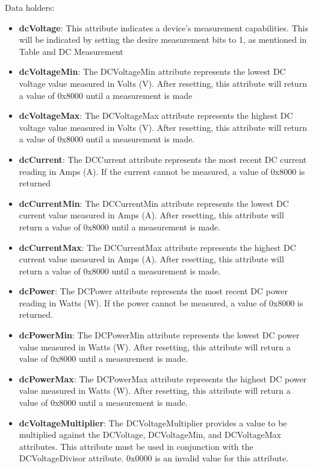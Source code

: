 \noindent
Data holders:

\begin{itemize}
\item \textbf{dcVoltage}: This attribute indicates a device’s measurement capabilities. This will be indicated by setting the desire measurement bits to 1, as mentioned in Table and DC Measurement
\item \textbf{dcVoltageMin}:     			The DCVoltageMin attribute represents the lowest DC voltage value measured in Volts (V). After resetting, this attribute will return a value of 0x8000 until a measurement is made					
\item \textbf{dcVoltageMax}: The DCVoltageMax attribute represents the highest DC voltage value measured in Volts (V). After resetting, this attribute will return a value of 0x8000 until a measurement is made.
\item \textbf{dcCurrent}: The DCCurrent attribute represents the most recent DC current reading in Amps (A). If the current cannot be measured, a value of 0x8000 is returned
\item \textbf{dcCurrentMin}: The DCCurrentMin attribute represents the lowest DC current value measured in Amps (A). After resetting, this attribute will return a value of 0x8000 until a measurement is made.
\item \textbf{dcCurrentMax}: The DCCurrentMax attribute represents the highest DC current value measured in Amps (A). After resetting, this attribute will return a value of 0x8000 until a measurement is made.
\item \textbf{dcPower}: The DCPower attribute represents the most recent DC power reading in Watts (W). If the power cannot be measured, a value of 0x8000 is returned.
\item \textbf{dcPowerMin}: The DCPowerMin attribute represents the lowest DC power value measured in Watts (W). After resetting, this attribute will return a value of 0x8000 until a measurement is made.
\item \textbf{dcPowerMax}: The DCPowerMax attribute represents the highest DC power value measured in Watts (W). After resetting, this attribute will return a value of 0x8000 until a measurement is made.
\item \textbf{dcVoltageMultiplier}: The DCVoltageMultiplier provides a value to be multiplied against the DCVoltage, DCVoltageMin, and DCVoltageMax attributes. This attribute must be used in conjunction with the DCVoltageDivisor attribute. 0x0000 is an invalid value for this attribute.

\end{itemize}
